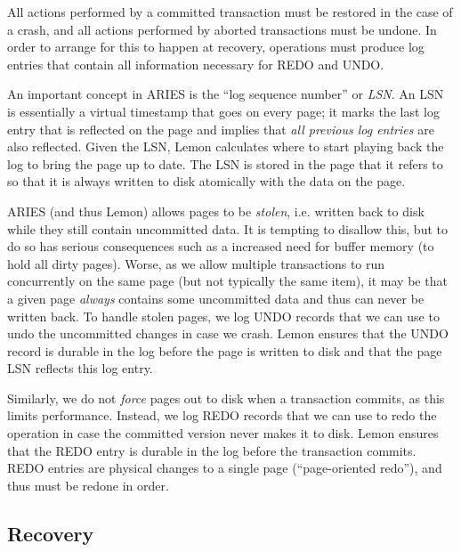 \documentclass[10pt,letterpaper,twocolumn,english]{article}
\newcommand{\yad}{Lemon\xspace}
\begin{document}
All actions performed by a committed transaction must be
restored in the case of a crash, and all actions performed by aborted
transactions must be undone. In order to arrange for this
to happen at recovery, operations must produce log entries that contain
all information necessary for REDO and UNDO.

An important concept in ARIES is the ``log sequence number'' or {\em
LSN}.  An LSN is essentially a virtual timestamp that goes on every
page; it marks the last log entry that is reflected on the page and
implies that {\em all previous log entries} are also reflected.  Given the
LSN, \yad calculates where to start playing back the log to bring the
page up to date.  The LSN is stored in the page that it refers to so
that it is always written to disk atomically with the data on the
page.

ARIES (and thus \yad) allows pages to be {\em stolen}, i.e. written
back to disk while they still contain uncommitted data.  It is
tempting to disallow this, but to do so has serious consequences such as
a increased need for buffer memory (to hold all dirty pages). Worse,
as we allow multiple transactions to run concurrently on the same page
(but not typically the same item), it may be that a given page {\em
always} contains some uncommitted data and thus can never be written
back.  To handle stolen pages, we log UNDO records that
we can use to undo the uncommitted changes in case we crash.  \yad
ensures that the UNDO record is durable in the log before the
page is written to disk and that the page LSN reflects this log entry.

Similarly, we do not {\em force} pages out to disk when a transaction
commits, as this limits performance.  Instead, we log REDO records
that we can use to redo the operation in case the committed version never
makes it to disk.  \yad ensures that the REDO entry is durable in the
log before the transaction commits.  REDO entries are physical changes
to a single page (``page-oriented redo''), and thus must be redone in
order. 





\subsection{Recovery}
\label{recovery}

%
\end{document}
